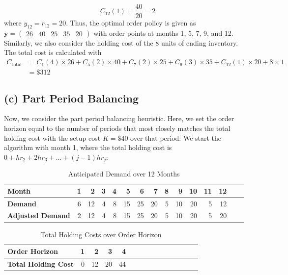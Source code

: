 \documentclass[12pt]{article}
\begin{document}
\begin{equation*}
    C_{12}(1) = \frac{40}{20} = 2
\end{equation*} where $y_{12} = r_{12} = 20$. Thus, the optimal order policy is given as $\mathbf{y} = \begin{pmatrix}
    26 & 40 & 25 & 35 & 20
\end{pmatrix}$ with order points at months 1, 5, 7, 9, and 12. Similarly, we also consider the holding cost of the 8 units of ending inventory. The total cost is calculated with \begin{align*}
    C_{\text{total}} &= C_{1}(4) \times 26 + C_{5}(2) \times 40 + C_{7}(2) \times 25 + C_{9}(3) \times 35 + C_{12}(1) \times 20 + 8 \times 1 \\ 
    &= \boxed{\$312}
\end{align*}

\subsection*{(c) Part Period Balancing}

Now, we consider the part period balancing heuristic. Here, we set the order horizon equal to the number of periods that most closely matches the total holding cost with the setup cost $K = \$ 40$ over that period. We start the algorithm with month 1, where the total holding cost is $0 + h r_{2} + 2 h r_{3} + \dots + (j-1) hr_j$:

\begin{table}[H]
    \centering
    \begin{tabular}{ l  r r  r  r  r  r  r  r  r  r  r  r  r  r }\toprule
        \textbf{Month} & 1 & 2 & 3 & 4 & 5 & 6 & 7 & 8 & 9 & 10 & 11 & 12 \\ \midrule
        \textbf{Demand} & 6 & 12 & 4 & 8 & 15 & 25 & 20 & 5 & 10 & 20 & 5 & 12 \\ 
        \textbf{Adjusted Demand} & 2 & 12 & 4 & 8 & 15 & 25 & 20 & 5 & 10 & 20 & 5 & 20 \\ \bottomrule
    \end{tabular}
    \caption{Anticipated Demand over 12 Months}
    \label{tab:1-demand2}
\end{table} 

\begin{table}[H]
    \centering
    \begin{tabular}{ l  r r  r  r  r  r  r  r  r  r  r  r  r  r }\toprule
        \textbf{Order Horizon} & 1 & 2 & 3 & 4 \\ \midrule
        \textbf{Total Holding Cost} & 0 & 12 & 20 & 44 \\ \bottomrule
    \end{tabular}
    \caption{Total Holding Costs over Order Horizon}
    \label{tab:1-partperiod}
\end{table} 
\end{document}

